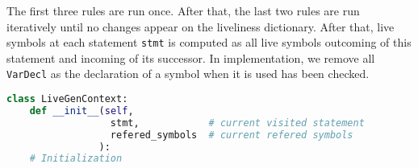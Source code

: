The first three rules are run once. After that, the last two rules are run iteratively until no changes appear on the liveliness dictionary. After that, live symbols at each statement \texttt{stmt} is computed as all live symbols outcoming of this statement and incoming of its successor. In implementation, we remove all \texttt{VarDecl} as the declaration of a symbol when it is used has been checked.

\begin{lstlisting}[language = python, caption={Liveliness generator context}, label={listing:live-gen-context}]
  class LiveGenContext:
    def __init__(self, 
                  stmt,            # current visited statement
                  refered_symbols  # current refered symbols
                ):
    # Initialization
\end{lstlisting}
